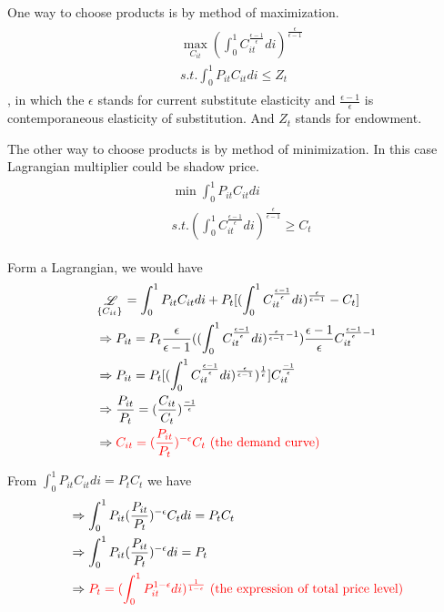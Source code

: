 \documentclass{article}
\begin{document}
One way to choose products is by method of maximization.
\begin{align}
\begin{split}
&\max\limits_{C_{it}} ( \int_{0}^{1}C_{it}^{\frac{\epsilon-1}{\epsilon}}di)^{\frac{\epsilon}{\epsilon-1}} 
\\&s.t. \int_{0}^{1} P_{it}C_{it}di \leqslant Z_{t}
\end{split}
\end{align}
, in which the $\epsilon$ stands for current substitute elasticity and $\frac{\epsilon-1}{\epsilon}$ is contemporaneous elasticity of substitution. And $Z_t$ stands for endowment.

The other way to choose products is by method of minimization. In this case Lagrangian multiplier could be shadow price.
\begin{align}
\begin{split}
& \min \int_{0}^{1} P_{it}C_{it}di
\\& s.t. (\int_{0}^{1}C_{it}^{\frac{\epsilon-1}{\epsilon}}di)^{\frac{\epsilon}{\epsilon-1}} \geqslant C_{t}
\end{split}
\end{align}

Form a Lagrangian, we would have
\begin{align}
&\mathop{\mathscr{L}}\limits_{\{C_{it}\}} =\int_{0}^{1} P_{it}C_{it}di+P_{t}[(\int_{0}^{1}C_{it}^{\frac{\epsilon-1}{\epsilon}}di)^{\frac{\epsilon}{\epsilon-1}}-C_{t}]
\\&\Rightarrow P_{it}=P_{t}\frac{\epsilon}{\epsilon-1}((\int_{0}^{1}C_{it}^{\frac{\epsilon-1}{\epsilon}}di)^{\frac{\epsilon}{\epsilon-1}-1})\frac{\epsilon-1}{\epsilon} C_{it}^{\frac{\epsilon-1}{\epsilon}-1}
\\&\Rightarrow P_{it}=P_{t}[(\int_{0}^{1}C_{it}^{\frac{\epsilon-1}{\epsilon}}di)^{\frac{\epsilon}{\epsilon-1}})^{\frac{1}{\epsilon}}]C_{it}^{\frac{-1}{\epsilon}}
\\&\Rightarrow \frac{P_{it}}{P_{t}}=(\frac{C_{it}}{C_{t}})^{\frac{-1}{\epsilon}}
\\&\Rightarrow \color{red} C_{it}=(\frac{P_{it}}{P_{t}})^{-\epsilon}C_{t} \text{ (the demand curve)}
\end{align}


From $\int_{0}^{1} P_{it}C_{it}di =P_{t}C_{t}$ we have
\begin{align}
&\Rightarrow \int_{0}^{1} P_{it}(\frac{P_{it}}{P_{t}})^{-\epsilon}C_{t} di=P_{t}C_{t}
\\&\Rightarrow \int_{0}^{1} P_{it}(\frac{P_{it}}{P_{t}})^{-\epsilon} di=P_{t}
\\&\Rightarrow \color{red} P_{t}=(\int_{0}^{1}P_{it}^{1-\epsilon}di)^{\frac{1}{1-\epsilon}} \text{ (the expression of total price level)}
\end{align}
\end{document}

